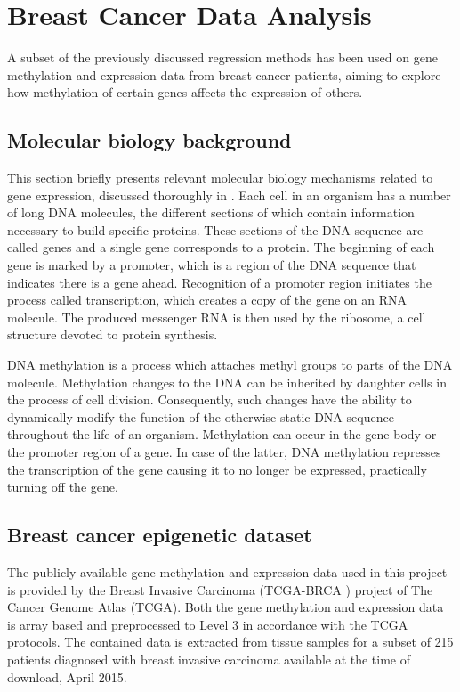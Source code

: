 \chapter{Breast Cancer Data Analysis}
A subset of the previously discussed regression methods has been used on gene methylation and expression data from breast cancer patients, aiming to explore how methylation of certain genes affects the expression of others.


\section{Molecular biology background} \label{sec:mol_bio}
This section briefly presents relevant molecular biology mechanisms related to gene expression, discussed thoroughly in \cite{setubal1997introduction}. Each cell in an organism has a number of long DNA molecules, the different sections of which contain information necessary to build specific proteins. These sections of the DNA sequence are called genes and a single gene corresponds to a protein. The beginning of each gene is marked by a promoter, which is a region of the DNA sequence that indicates there is a gene ahead. Recognition of a promoter region initiates the process called transcription, which creates a copy of the gene on an RNA molecule. The produced messenger RNA is then used by the ribosome, a cell structure devoted to protein synthesis.

DNA methylation is a process which attaches methyl groups to parts of the DNA molecule. Methylation changes to the DNA can be inherited by daughter cells in the process of cell division. Consequently, such changes have the ability to dynamically modify the function of the otherwise static DNA sequence throughout the life of an organism. Methylation can occur in the gene body or the promoter region of a gene. In case of the latter, DNA methylation represses the transcription of the gene causing it to no longer be expressed, practically turning off the gene. 


\section{Breast cancer epigenetic dataset}
The publicly available gene methylation and expression data used in this project is provided by the Breast Invasive Carcinoma (TCGA-BRCA \cite{cancer2012comprehensive}) project of The Cancer Genome Atlas (TCGA). Both the gene methylation and expression data is array based and preprocessed to Level 3 in accordance with the TCGA protocols. The contained data is extracted from tissue samples for a subset of 215 patients diagnosed with breast invasive carcinoma available at the time of download, April 2015. 

